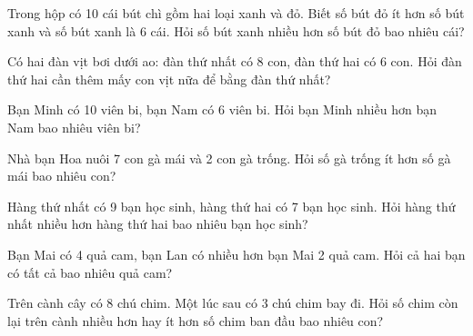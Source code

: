 \begin{ex}
Trong hộp có 10 cái bút chì gồm hai loại xanh và đỏ. Biết số bút đỏ ít hơn số bút xanh và số bút xanh là 6 cái. Hỏi số bút xanh nhiều hơn số bút đỏ bao nhiêu cái?
\end{ex}

\begin{ex}
Có hai đàn vịt bơi dưới ao: đàn thứ nhất có 8 con, đàn thứ hai có 6 con. Hỏi đàn thứ hai cần thêm mấy con vịt nữa để bằng đàn thứ nhất?
\end{ex}

\begin{ex}
Bạn Minh có 10 viên bi, bạn Nam có 6 viên bi. Hỏi bạn Minh nhiều hơn bạn Nam bao nhiêu viên bi?
\end{ex}

\begin{ex}
Nhà bạn Hoa nuôi 7 con gà mái và 2 con gà trống. Hỏi số gà trống ít hơn số gà mái bao nhiêu con?
\end{ex}

\begin{ex}
Hàng thứ nhất có 9 bạn học sinh, hàng thứ hai có 7 bạn học sinh. Hỏi hàng thứ nhất nhiều hơn hàng thứ hai bao nhiêu bạn học sinh?
\end{ex}

\begin{ex}
Bạn Mai có 4 quả cam, bạn Lan có nhiều hơn bạn Mai 2 quả cam. Hỏi cả hai bạn có tất cả bao nhiêu quả cam?
\end{ex}

\begin{ex}
Trên cành cây có 8 chú chim. Một lúc sau có 3 chú chim bay đi. Hỏi số chim còn lại trên cành nhiều hơn hay ít hơn số chim ban đầu bao nhiêu con?
\end{ex}

